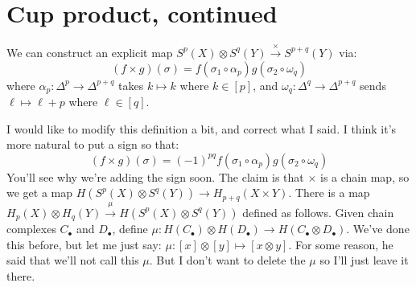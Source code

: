 \section{Cup product, continued}
We can construct an explicit map $S^p(X)\otimes S^q(Y)\xrightarrow{\times} S^{p+q}(Y)$ via:
\begin{equation*}
(f\times g)(\sigma)=f(\sigma_1\circ\alpha_p)g(\sigma_2\circ\omega_q)
\end{equation*}
where $\alpha_p:\Delta^p\to\Delta^{p+q}$ takes $k\mapsto k$ where $k\in[p]$, and $\omega_q:\Delta^q\to\Delta^{p+q}$ sends $\ell\mapsto \ell+p$ where $\ell\in[q]$.

I would like to modify this definition a bit, and correct what I said. I think it's more natural to put a sign so that:
\begin{equation*}
(f\times g)(\sigma)=(-1)^{pq}f(\sigma_1\circ\alpha_p)g(\sigma_2\circ\omega_q)
\end{equation*}
You'll see why we're adding the sign soon. The claim is that $\times$ is a chain map, so we get a map $ H(S^p(X)\otimes S^q(Y))\to H_{p+q}(X\times Y)$. There is a map $ H_p(X)\otimes H_q(Y)\xrightarrow{\mu} H(S^p(X)\otimes S^q(Y))$ defined as follows. Given chain complexes $C_\bullet$ and $D_\bullet$, define $\mu: H(C_\bullet)\otimes H(D_\bullet)\to H(C_\bullet\otimes D_\bullet)$. We've done this before, but let me just say: $\mu:[x]\otimes [y]\mapsto [x\otimes y]$. For some reason, he said that we'll not call this $\mu$. But I don't want to delete the $\mu$ so I'll just leave it there.

